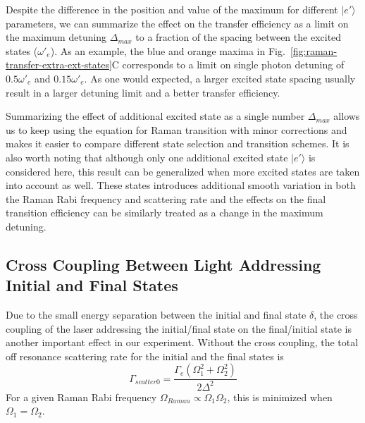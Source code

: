Despite the difference in the position and value of the maximum for different
$|e'\rangle$ parameters, we can summarize the effect on the transfer efficiency
as a limit on the maximum detuning $\Delta_{max}$ to a fraction of the spacing
between the excited states ($\omega'_e$).
As an example, the blue and orange maxima in Fig.~\ref{fig:raman-transfer-extra-ext-states}C
corresponds to a limit on single photon detuning of $0.5\omega'_e$ and $0.15\omega'_e$.
As one would expected, a larger excited state spacing usually result in
a larger detuning limit and a better transfer efficiency.

Summarizing the effect of additional excited state as a single number $\Delta_{max}$ allows
us to keep using the equation for Raman transition with minor corrections
and makes it easier to compare different state selection and transition schemes.
It is also worth noting that although only one additional excited state $|e'\rangle$
is considered here, this result can be generalized when more excited states are taken into account
as well. These states introduces additional smooth variation in both the Raman Rabi frequency
and scattering rate and the effects on the final transition efficiency can be similarly
treated as a change in the maximum detuning.

\subsection{Cross Coupling Between Light Addressing Initial and Final States}
\label{ch:raman-transfer:cross-couple}

Due to the small energy separation between the initial and final state $\delta$,
the cross coupling of the laser addressing the initial/final state on the final/initial state
is another important effect in our experiment.
Without the cross coupling, the total off resonance scattering rate for
the initial and the final states is
\[
  \Gamma_{scatter0}=\frac{\Gamma_e\left(\Omega_1^2+\Omega_2^2\right)}{2\Delta^2}
\]
For a given Raman Rabi frequency $\Omega_{Raman}\propto\Omega_1\Omega_2$, this is
minimized when $\Omega_1=\Omega_2$.\todo{\cite{}}

